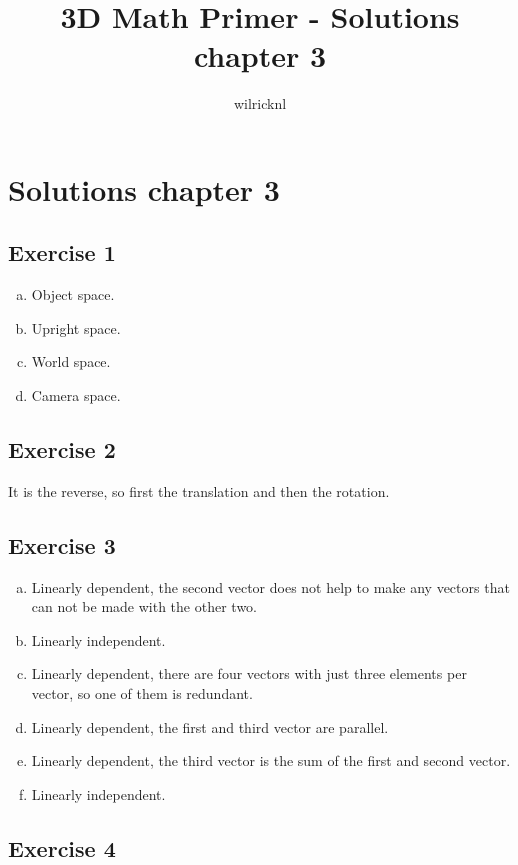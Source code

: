 \documentclass[11pt]{article}
\author{wilricknl}
\title{3D Math Primer - Solutions chapter 3}
\begin{document}
\maketitle

\section{Solutions chapter 3}

\subsection{Exercise 1}

\begin{enumerate}[a.]
	\item Object space.
	\item Upright space.
	\item World space.
	\item Camera space.
\end{enumerate}

\subsection{Exercise 2}

It is the reverse, so first the translation and then the rotation.

\subsection{Exercise 3}

\begin{enumerate}[a.]
	\item Linearly dependent, the second vector does not help to make any vectors that can not be made with the other two.
	\item Linearly independent.
	\item Linearly dependent, there are four vectors with just three elements per vector, so one of them is redundant.
	\item Linearly dependent, the first and third vector are parallel.
	\item Linearly dependent, the third vector is the sum of the first and second vector.
	\item Linearly independent.
\end{enumerate}

\subsection{Exercise 4}
\end{document}
